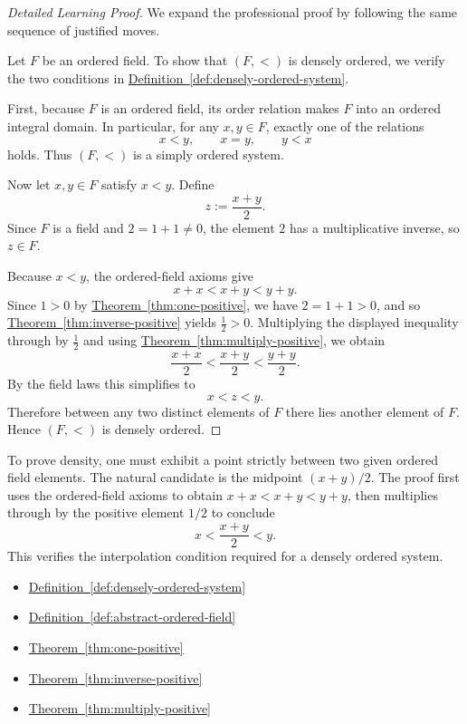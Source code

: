 \begin{proof}[Detailed Learning Proof]
\LRAProofBodyStart
We expand the professional proof by following the same sequence of justified moves.

Let $F$ be an ordered field. To show that $(F,<)$ is densely ordered, we verify
the two conditions in
\hyperref[def:densely-ordered-system]{Definition~\ref*{def:densely-ordered-system}}.

First, because $F$ is an ordered field, its order relation makes $F$ into an
ordered integral domain. In particular, for any $x,y\in F$, exactly one of the
relations
\[
x<y,\qquad x=y,\qquad y<x
\]
holds. Thus $(F,<)$ is a simply ordered system.

Now let $x,y\in F$ satisfy $x<y$. Define
\[
z:=\frac{x+y}{2}.
\]
Since $F$ is a field and $2=1+1\neq 0$, the element $2$ has a multiplicative
inverse, so $z\in F$.

Because $x<y$, the ordered-field axioms give
\[
x+x<x+y<y+y.
\]
Since $1>0$ by
\hyperref[thm:one-positive]{Theorem~\ref*{thm:one-positive}}, we have
$2=1+1>0$, and so
\hyperref[thm:inverse-positive]{Theorem~\ref*{thm:inverse-positive}} yields
$\frac12>0$. Multiplying the displayed inequality through by $\frac12$ and using
\hyperref[thm:multiply-positive]{Theorem~\ref*{thm:multiply-positive}}, we obtain
\[
\frac{x+x}{2}<\frac{x+y}{2}<\frac{y+y}{2}.
\]
By the field laws this simplifies to
\[
x<z<y.
\]
Therefore between any two distinct elements of $F$ there lies another element
of $F$. Hence $(F,<)$ is densely ordered.
\end{proof}

\begin{remark*}
To prove density, one must exhibit a point strictly between two given ordered
field elements. The natural candidate is the midpoint $(x+y)/2$. The proof
first uses the ordered-field axioms to obtain $x+x<x+y<y+y$, then multiplies
through by the positive element $1/2$ to conclude
\[
x<\frac{x+y}{2}<y.
\]
This verifies the interpolation condition required for a densely ordered
system.
\end{remark*}

\begin{dependencies}
\begin{itemize}
  \item \hyperref[def:densely-ordered-system]{Definition~\ref*{def:densely-ordered-system}}
  \item \hyperref[def:abstract-ordered-field]{Definition~\ref*{def:abstract-ordered-field}}
  \item \hyperref[thm:one-positive]{Theorem~\ref*{thm:one-positive}}
  \item \hyperref[thm:inverse-positive]{Theorem~\ref*{thm:inverse-positive}}
  \item \hyperref[thm:multiply-positive]{Theorem~\ref*{thm:multiply-positive}}
\end{itemize}
\end{dependencies}

\clearpage
